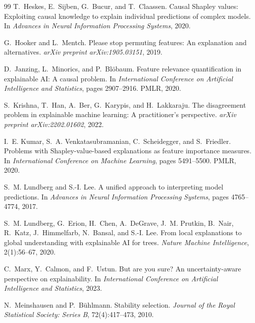 \documentclass[11pt]{article}
\begin{document}
\begin{thebibliography}{99}
T.~Heskes, E.~Sijben, G.~Bucur, and T.~Claassen.
\newblock Causal {S}hapley values: Exploiting causal knowledge to explain
  individual predictions of complex models.
\newblock In \emph{Advances in Neural Information Processing Systems}, 2020.

G.~Hooker and L.~Mentch.
\newblock Please stop permuting features: An explanation and alternatives.
\newblock \emph{arXiv preprint arXiv:1905.03151}, 2019.

D.~Janzing, L.~Minorics, and P.~Bl{\"o}baum.
\newblock Feature relevance quantification in explainable {AI}: A causal
  problem.
\newblock In \emph{International Conference on Artificial Intelligence and
  Statistics}, pages 2907--2916. PMLR, 2020.

S.~Krishna, T.~Han, A.~Ber, G.~Karypis, and H.~Lakkaraju.
\newblock The disagreement problem in explainable machine learning: A
  practitioner's perspective.
\newblock \emph{arXiv preprint arXiv:2202.01602}, 2022.

I.~E. Kumar, S.~A. Venkatasubramanian, C.~Scheidegger, and S.~Friedler.
\newblock Problems with {S}hapley-value-based explanations as feature importance
  measures.
\newblock In \emph{International Conference on Machine Learning}, pages
  5491--5500. PMLR, 2020.

S.~M. Lundberg and S.-I. Lee.
\newblock A unified approach to interpreting model predictions.
\newblock In \emph{Advances in Neural Information Processing Systems}, pages
  4765--4774, 2017.

S.~M. Lundberg, G.~Erion, H.~Chen, A.~DeGrave, J.~M. Prutkin, B.~Nair,
  R.~Katz, J.~Himmelfarb, N.~Bansal, and S.-I. Lee.
\newblock From local explanations to global understanding with explainable {AI}
  for trees.
\newblock \emph{Nature Machine Intelligence}, 2(1):56--67, 2020.

C.~Marx, Y.~Calmon, and F.~Ustun.
\newblock But are you sure? An uncertainty-aware perspective on explainability.
\newblock In \emph{International Conference on Artificial Intelligence and
  Statistics}, 2023.

N.~Meinshausen and P.~B{\"u}hlmann.
\newblock Stability selection.
\newblock \emph{Journal of the Royal Statistical Society: Series B},
  72(4):417--473, 2010.


\end{thebibliography}
\end{document}

